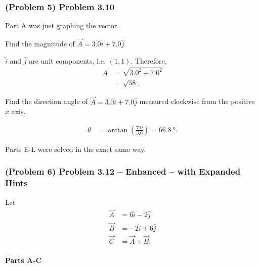 \newpage

\subsubsection{(Problem 5) Problem 3.10}

\problempart

Part A was just graphing the vector.

\problempart

Find the magnitude of $\vec{A}=3.0\hat{i} + 7.0\hat{j}$.

\begin{solution}
	$\hat{i}$ and $\hat{j}$ are unit components, i.e. $\left( 1,1 \right)$. Therefore,
	\begin{align*}
		A &= \sqrt{3.0^2 + 7.0^2} \\
		&= \sqrt{58}
		.\end{align*}
\end{solution}

\problempart

Find the direction angle of $\vec{A} = 3.0\hat{i} + 7.0\hat{j}$ measured clockwise from the positive $x$ axis.

\begin{solution}
	\begin{align*}
		\theta &= \arctan \left( \frac{7.0}{3.0} \right) = \SI{66.8}{\degree}
		.\end{align*}
\end{solution}

\begin{remark}
	Parts E-L were solved in the exact same way.
\end{remark}

\newpage

\subsubsection{(Problem 6) Problem 3.12 -- Enhanced -- with Expanded Hints}

Let
\begin{align*}
	\vec{A} &= 6\hat{i} - 2\hat{j} \\
	\vec{B} &= -2\hat{i} + 6\hat{j} \\
	\vec{C} &= \vec{A} + \vec{B}
	.\end{align*}

\setcounter{partcounter}{3}
\paragraph{Parts A-C}

